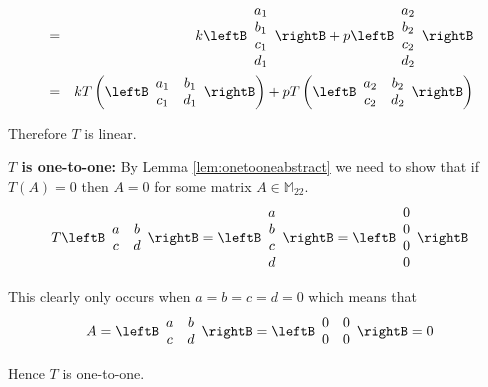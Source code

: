 \begin{solution}
\begin{eqnarray*}
&=& k \leftB \begin{array}{c} a_1 \\  b_1 \\  c_1 \\  d_1 \end{array} \rightB + p \leftB \begin{array}{c}  a_2 \\  b_2 \\  c_2 \\  d_2 \end{array} \rightB \\
&=& k T \left(\leftB\begin{array}{cc} a_1 & b_1 \\ c_1 & d_1 \end{array}\rightB \right) +  p T \left(\leftB\begin{array}{cc} a_2 & b_2 \\ c_2 & d_2 \end{array}\rightB \right)
\end{eqnarray*}

Therefore $T$ is linear. 

\textbf{$T$ is one-to-one:}
By Lemma \ref{lem:onetooneabstract} we need to show that if $T(A) = 0$ then $A = 0$ for some matrix $A \in \mathbb{M}_{22}$. 
\[
T\leftB\begin{array}{cc} a & b \\ c & d \end{array}\rightB
= \leftB\begin{array}{c} a\\ b\\ c \\ d \end{array}\rightB 
= \leftB\begin{array}{c} 0 \\ 0 \\ 0 \\ 0 \end{array}\rightB 
\]

This clearly only occurs when $a=b=c=d=0$ which means that 
\[
A = \leftB\begin{array}{cc} a & b \\ c & d \end{array}\rightB = \leftB\begin{array}{cc} 0 & 0 \\ 0 & 0 \end{array}\rightB = 0
\]

Hence $T$ is one-to-one.


\end{solution}
